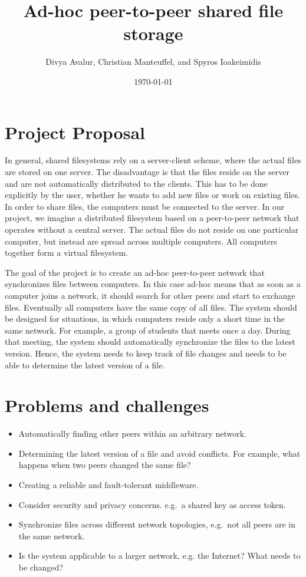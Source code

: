 \documentclass[a4paper, 11pt]{scrartcl}                %
\title{\Large Ad-hoc peer-to-peer shared file storage}
\author{\small Divya Avalur, Christian Manteuffel, and Spyros Ioakeimidis}
\date{\small \today}
\begin{document}
\maketitle

\thispagestyle{empty}

\section{Project Proposal}

In general, shared filesystems rely on a server-client scheme, where the actual files are stored on one server. 
The disadvantage is that the files reside on the server and are not automatically distributed to the clients. This has to be done explicitly by the user, whether he wants to add new files or work on existing files.
In order to share files, the computers must be connected to the server.
In our project, we imagine a distributed filesystem based on a peer-to-peer network that operates without a central server. 
The actual files do not reside on one particular computer, but instead are spread across multiple computers. All computers together form a virtual filesystem.

The goal of the project is to create an ad-hoc peer-to-peer network that synchronizes files between  computers. In this case ad-hoc means that as soon as a computer joins a network, it should search for other peers and start to exchange files. Eventually all computers have the same copy of all files. 
The system should be designed for situations, in which computers reside only a short time in the same network. For example, a group of students that meets once a day. During that meeting, the system should automatically synchronize the files to the latest version. 
Hence, the system needs to keep track of file changes and needs to be able to determine the latest version of a file. 

\section{Problems and challenges}

\begin{itemize}
    \setlength{\itemsep}{0pt} \setlength{\parskip}{0pt}

	\item Automatically finding other peers within an arbitrary network.
	\item Determining the latest version of a file and avoid conflicts.  For example, what happens when two peers changed the same file?
	\item Creating a reliable and fault-tolerant middleware.
	\item Consider security and privacy concerns. e.g.\ a shared key as access token. 
	\item Synchronize files across different network topologies, e.g.\ not all peers are in the same network.
	 \item Is the system applicable to a larger network, e.g.  the Internet? What needs to be changed? 
\end{itemize}
\end{document}
